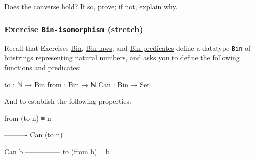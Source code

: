 \begin{fence}
\begin{code}%
\>[0]\<%
\\
\>[0][@{}l@{\AgdaIndent{0}}]%
\>[2]\AgdaSpace{}%
\AgdaSymbol{:}\AgdaSpace{}%
\AgdaSpace{}%
\AgdaSymbol{\{}\AgdaSpace{}%
\AgdaSymbol{:}\AgdaSpace{}%
\AgdaSymbol{\}}\AgdaSpace{}%
\AgdaSymbol{\{}\AgdaSpace{}%
\AgdaSymbol{:}\AgdaSpace{}%
\AgdaSpace{}%
\AgdaSpace{}%
\AgdaSymbol{\}}\<%
\\
\>[2][@{}l@{\AgdaIndent{0}}]%
\>[4]%
\>[657I]\AgdaFunction{∃[}\AgdaSpace{}%
\AgdaSpace{}%
\AgdaFunction{]}\AgdaSpace{}%
\AgdaSymbol{(}\AgdaSpace{}%
\AgdaSpace{}%
\AgdaSymbol{)}\<%
\\
\>[.][@{}l@{}]\<[657I]%
\>[6]\AgdaComment{--------------}\<%
\\
%
\>[4]\AgdaSpace{}%
\AgdaSpace{}%
\AgdaSpace{}%
\AgdaSpace{}%
\AgdaSpace{}%
\AgdaSpace{}%
\AgdaSymbol{)}\<%
\end{code}
\end{fence}

Does the converse hold? If so, prove; if not, explain why.

\hypertarget{Quantifiers-Bin-isomorphism}{%
\subsubsection{\texorpdfstring{Exercise \texttt{Bin-isomorphism}
(stretch)}{Exercise Bin-isomorphism (stretch)}}\label{Quantifiers-Bin-isomorphism}}

Recall that Exercises \protect\hyperlink{Naturals-Bin}{Bin},
\protect\hyperlink{Induction-Bin-laws}{Bin-laws}, and
\protect\hyperlink{Relations-Bin-predicates}{Bin-predicates} define a
datatype \texttt{Bin} of bitstrings representing natural numbers, and
asks you to define the following functions and predicates:

\begin{myDisplay}
to   : ℕ → Bin
from : Bin → ℕ
Can  : Bin → Set
\end{myDisplay}

And to establish the following properties:

\begin{myDisplay}
from (to n) ≡ n

----------
Can (to n)

Can b
---------------
to (from b) ≡ b
\end{myDisplay}

